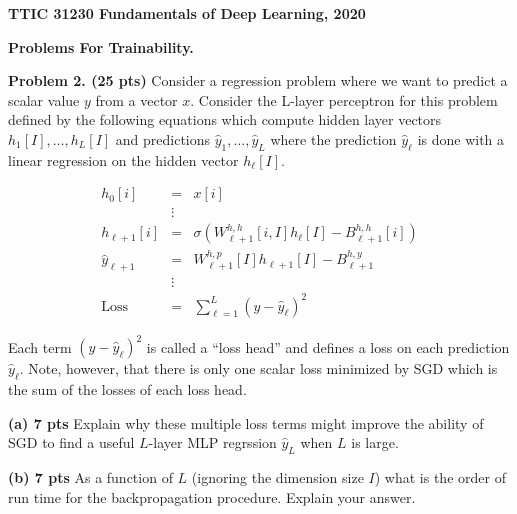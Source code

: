 \documentclass{article}
\newcommand{\solution}[1]{}
\begin{document}
\centerline{\bf TTIC 31230 Fundamentals of Deep Learning, 2020}
\medskip
\centerline{\bf Problems For Trainability.}

\bigskip

{\bf Problem 2. (25 pts)}  Consider a regression problem where we want to predict a scalar value $y$ from a vector $x$.
Consider the L-layer perceptron for this problem defined by the following equations
which compute hidden layer vectors $h_1[I], \ldots, h_L[I]$ and predictions $\hat{y}_1, \ldots, \hat{y}_L$ where
the prediction $\hat{y}_\ell$ is done with a linear regression on the hidden vector $h_\ell[I]$.

\begin{eqnarray*}
  h_0[i] & = & x[i] \\
  & \vdots & \\
  h_{\ell+1}[i] & = & \sigma(W^{h,h}_{\ell+1}[i,I]h_\ell[I] - B^{h,h}_{\ell+1}[i]) \\
  \hat{y}_{\ell +1} & = & W^{h,p}_{\ell+1}[I]h_{\ell+1}[I]- B^{h,y}_{\ell+1} \\
  & \vdots & \\
  \mathrm{Loss} & = & \sum_{\ell = 1}^L (y - \hat{y}_\ell)^2
\end{eqnarray*}

Each term $(y-\hat{y}_\ell)^2$ is called a ``loss head'' and defines a loss on each prediction $\hat{y}_{\ell}$.
Note, however, that there is only one scalar loss minimized by SGD which is the sum of the losses of each loss head.

\medskip
{\bf (a) 7 pts} Explain why these multiple loss terms might improve the ability of SGD to find a useful $L$-layer MLP regrssion $\hat{y}_L$ when $L$ is large.

\solution{
  SGD on deep networks with the loss term only occuring at the final layer is not generally effective because the lower layers
  never get meaninful gradients.  Placing loss functions near the lower layers will cause the lower hidden layers to have meaningful
  gradients and produce informative features.
}

\medskip
{\bf (b) 7 pts} As a function of $L$ (ignoring the dimension size $I$) what is the order of run time for the backpropagation procedure.
Explain your answer.

\solution{It is $O(L)$ --- linear in $L$.  Backpropagation loops over the assignments of the program and takes time proportional to the size of the program.
  Back-propagation over the final sum of losses produces a gradient for each prediction $\hat{y}_\ell$ which can be used as we back-propagate over the
  earlier assignments.
}
\end{document}
